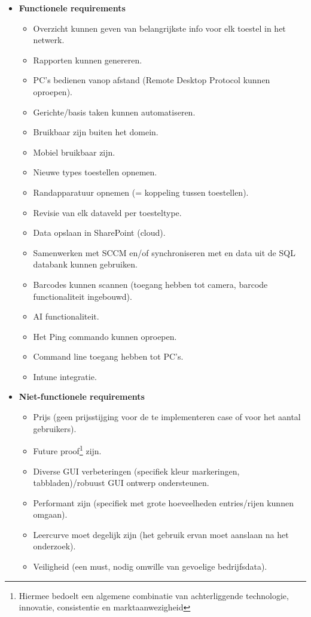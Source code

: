 \begin{itemize}
    \item \textbf{Functionele requirements}
    \begin{itemize}
        \item Overzicht kunnen geven van belangrijkste info voor elk toestel in het netwerk.
        \item Rapporten kunnen genereren.
        \item PC's bedienen vanop afstand (Remote Desktop Protocol kunnen oproepen).
        \item Gerichte/basis taken kunnen automatiseren.
        \item Bruikbaar zijn buiten het domein.
        \item Mobiel bruikbaar zijn.
        \item Nieuwe types toestellen opnemen.
        \item Randapparatuur opnemen (= koppeling tussen toestellen).
        \item Revisie van elk dataveld per toesteltype.
        \item Data opslaan in SharePoint (cloud).
        \item Samenwerken met SCCM en/of synchroniseren met en data uit de SQL databank kunnen gebruiken.
        \item Barcodes kunnen scannen (toegang hebben tot camera, barcode functionaliteit ingebouwd).
        \item AI functionaliteit.
        \item Het Ping commando kunnen oproepen.
        \item Command line toegang hebben tot PC's.
        \item Intune integratie.
    \end{itemize}
    \item \textbf{Niet-functionele requirements}
    \begin{itemize}
        \item Prijs (geen prijsstijging voor de te implementeren case of voor het aantal gebruikers).
        \item Future proof\footnote{Hiermee bedoelt een algemene combinatie van achterliggende technologie, innovatie, consistentie en marktaanwezigheid} zijn.
        \item Diverse GUI verbeteringen (specifiek kleur markeringen, tabbladen)/robuust GUI ontwerp ondersteunen.
        \item Performant zijn (specifiek met grote hoeveelheden entries/rijen kunnen omgaan).
        \item Leercurve moet degelijk zijn (het gebruik ervan moet aanslaan na het onderzoek).
        \item Veiligheid (een must, nodig omwille van gevoelige bedrijfsdata).
    \end{itemize}
\end{itemize}


